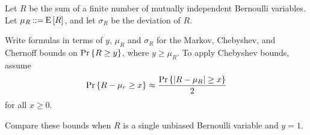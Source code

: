 \documentclass[11pt]{article}
\begin{document}
%

\begin{problem} 
Let $R$ be the sum of a finite number of mutually independent Bernoulli
variables.  Let $\mu_R \mathbin{::=} \mathop{\textup{E}}\nolimits\left[R\right]$, and let $\sigma_R$ be the
deviation of $R$.

\begin{problemparts}

\problempart Write formulas in terms of $y$, $\mu_R$ and $\sigma_R$ for
the Markov, Chebyshev, and Chernoff bounds on $\mathop{\textup{Pr}}\nolimits\left\{R \geq y\right\}$, where $y
\geq \mu_R$.  \hint To apply Chebyshev bounds, assume
\begin{equation}\label{C/2}
\mathop{\textup{Pr}}\nolimits\left\{R-\mu_r \geq x\right\} \approx \frac{\mathop{\textup{Pr}}\nolimits\left\{\left|R - \mu_R\right| \geq x\right\}}{2}
\end{equation}
for all $x \geq 0$.


\problempart  Compare these bounds when $R$ is a single unbiased Bernoulli
variable and $y=1$.

\end{problemparts}
\end{problem}
\end{document}
